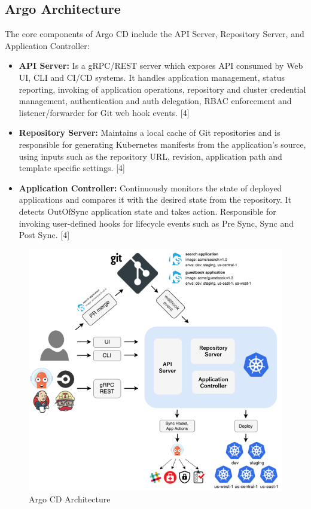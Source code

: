 \documentclass[conference]{IEEEtran}
\begin{document}
\subsection{Argo Architecture}
The core components of Argo CD include the API Server, Repository Server, and Application Controller:
\begin{itemize}
    \item \textbf{API Server:} Is a gRPC/REST server which exposes API consumed by Web UI, CLI and CI/CD systems. It handles application management, status reporting, invoking of application operations, repository and cluster credential management, authentication and auth delegation, RBAC enforcement and listener/forwarder for Git web hook events. [4]
    
    \item \textbf{Repository Server:} Maintains a local cache of Git repositories and is responsible for generating Kubernetes manifests from the application's source, using inputs such as the repository URL, revision, application path and template specific settings. [4]
    
    \item \textbf{Application Controller:} Continuously monitors the state of deployed applications and compares it with the desired state from the repository. It detects OutOfSync application state and takes action. Responsible for invoking user-defined hooks for lifecycle events such as Pre Sync, Sync and Post Sync. [4]
\end{itemize}

\begin{figure}[htbp]
    \centering
    \includegraphics[width=0.7\linewidth]{Argo_CD_Architecture.png}
    \caption{Argo CD Architecture}
    \label{fig:argo-cd-arch}
\end{figure}
\end{document}
